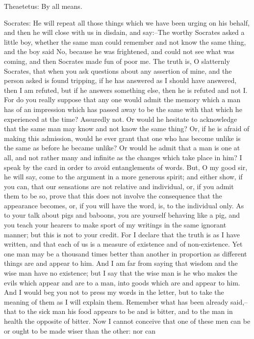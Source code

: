 Theaetetus: By all means.

Socrates: He will repeat all those things which we have been urging on
his behalf, and then he will close with us in disdain, and say:--The
worthy Socrates asked a little boy, whether the same man could remember
and not know the same thing, and the boy said No, because he was
frightened, and could not see what was coming, and then Socrates made
fun of poor me. The truth is, O slatternly Socrates, that when you ask
questions about any assertion of mine, and the person asked is found
tripping, if he has answered as I should have answered, then I am
refuted, but if he answers something else, then he is refuted and not
I. For do you really suppose that any one would admit the memory which a
man has of an impression which has passed away to be the same with that
which he experienced at the time? Assuredly not. Or would he hesitate to
acknowledge that the same man may know and not know the same thing? Or,
if he is afraid of making this admission, would he ever grant that one
who has become unlike is the same as before he became unlike? Or would
he admit that a man is one at all, and not rather many and infinite as
the changes which take place in him? I speak by the card in order to
avoid entanglements of words. But, O my good sir, he will say, come to
the argument in a more generous spirit; and either show, if you can,
that our sensations are not relative and individual, or, if you admit
them to be so, prove that this does not involve the consequence that the
appearance becomes, or, if you will have the word, is, to the individual
only. As to your talk about pigs and baboons, you are yourself behaving
like a pig, and you teach your hearers to make sport of my writings in
the same ignorant manner; but this is not to your credit. For I declare
that the truth is as I have written, and that each of us is a measure
of existence and of non-existence. Yet one man may be a thousand times
better than another in proportion as different things are and appear
to him. And I am far from saying that wisdom and the wise man have no
existence; but I say that the wise man is he who makes the evils which
appear and are to a man, into goods which are and appear to him. And
I would beg you not to press my words in the letter, but to take the
meaning of them as I will explain them. Remember what has been already
said,--that to the sick man his food appears to be and is bitter, and to
the man in health the opposite of bitter. Now I cannot conceive that one
of these men can be or ought to be made wiser than the other: nor can
